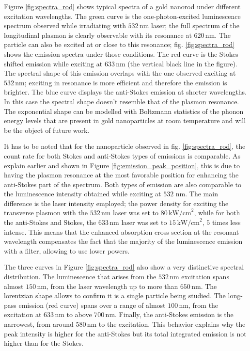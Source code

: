 \documentclass[journal=nalefd,manuscript=letter]{achemso}
\newcommand{\nm}{\ensuremath{\,\textrm{nm}}}
\newcommand{\pwr}{\ensuremath{\,\textrm{kW/cm}^2}}
\begin{document}
Figure \ref{fig:spectra_rod} shows typical spectra of a gold nanorod under
different excitation wavelengths. The green curve is the one-photon-excited
luminescence spectrum observed while irradiating with $532\nm$ laser; the full
spectrum of the longitudinal plasmon is clearly observable with its resonance at
$620\nm$. The particle can also be excited at or close to this resonance; fig. 
\ref{fig:spectra_rod} shows the emission spectra under those conditions. The red
curve is the Stokes shifted emission while exciting at $633\nm$ (the vertical
black line in the figure). The spectral shape of this emission overlaps with the
one observed exciting at $532\nm$; exciting in resonance is more efficient and
therefore the emission is brighter. The blue curve displays the anti-Stokes
emission at shorter wavelengths. In this case the spectral shape doesn't
resemble that of the plasmon resonance. The exponential shape can be modelled
with Boltzmann statistics\cite{He2015} of the phonon energy levels that are
present in gold nanoparticles at room temperature and will be the object of future work.

It has to be noted that for the nanoparticle observed in fig.
\ref{fig:spectra_rod}, the count rate for both Stokes and anti-Stokes types of
emissions is comparable. As explain earlier and shown in Figure
\ref{fig:emission_peak_position}, this is due to having the plasmon resonance at
the most favorable position for enhancing the anti-Stokes part of the spectrum.
Both types of emission are also comparable to the luminescence intensity
obtained while exciting at $532\,\nm$. The main difference is the laser
intensity employed; the power density for exciting the transverse plasmon with
the $532\nm$ laser was set to $80\pwr$, while for both the anti-Stokes and
Stokes, the $633\nm$ laser was set to $15\pwr$, $5$ times less intense.
This means that the enhanced absorption cross section at the resonant wavelength
compensates the fact that the majority of the luminescence emission with a
filter, allowing to use lower powers.

The three curves in Figure \ref{fig:spectra_rod} also show a very distinctive
spectral distribution. The luminescence that arises from the $532\nm$
excitation spans almost $150\nm$, from the laser wavelength up to
more than $650\nm$. The lorentzian shape allows to confirm it is a single
particle being studied. The long-pass emission (red curve) spans over a range of
almost $100\nm$, from the excitation at $633\nm$ to above $700\nm$. Finally, the
anti-Stokes emission is the narrowest, from around $580\nm$ to the excitation.
This behavior explains why the peak intensity is higher for the
anti-Stokes but its total integrated emission is not higher than for the Stokes. 
\end{document}
